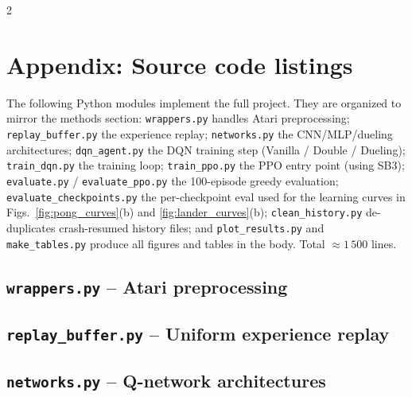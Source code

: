 \documentclass[12pt]{article}
\begin{document}
{\footnotesize
\setlength{\bibsep}{0pt plus 0.1ex}
\renewcommand{\baselinestretch}{0.95}\selectfont
\begin{multicols}{2}

\end{multicols}
}

\clearpage
\appendix
\section*{Appendix: Source code listings}

The following Python modules implement the full project. They are organized
to mirror the methods section: \texttt{wrappers.py} handles Atari
preprocessing; \texttt{replay\_buffer.py} the experience replay;
\texttt{networks.py} the CNN/MLP/dueling architectures; \texttt{dqn\_agent.py}
the DQN training step (Vanilla / Double / Dueling); \texttt{train\_dqn.py}
the training loop; \texttt{train\_ppo.py} the PPO entry point (using SB3);
\texttt{evaluate.py} / \texttt{evaluate\_ppo.py} the 100-episode greedy
evaluation; \texttt{evaluate\_checkpoints.py} the per-checkpoint eval used
for the learning curves in Figs.~\ref{fig:pong_curves}(b) and
\ref{fig:lander_curves}(b); \texttt{clean\_history.py} de-duplicates
crash-resumed history files; and \texttt{plot\_results.py} and
\texttt{make\_tables.py} produce all figures and tables in the body.
Total $\approx 1\,500$ lines.

\lstset{style=py}

\subsection*{\texttt{wrappers.py} -- Atari preprocessing}


\subsection*{\texttt{replay\_buffer.py} -- Uniform experience replay}


\subsection*{\texttt{networks.py} -- Q-network architectures}

\end{document}
